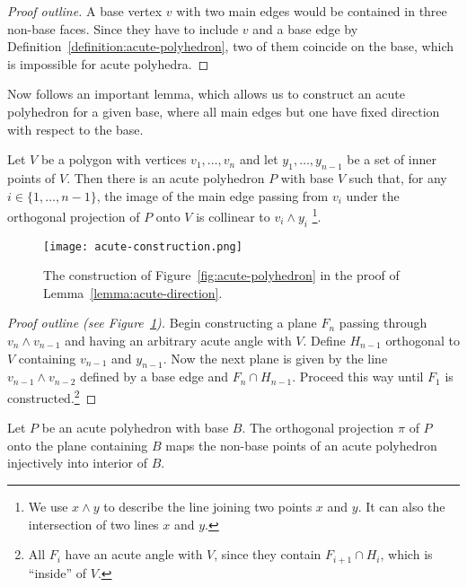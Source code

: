 \begin{proof}[Proof outline]
  A base vertex $v$ with two main edges would be contained in three non-base faces. Since they have to include $v$ and a base edge by Definition~\ref{definition:acute-polyhedron}, two of them coincide on the base, which is impossible for acute polyhedra.
\end{proof}

Now follows an important lemma, which allows us to construct an acute polyhedron for a given base, where all main edges but one have fixed direction with respect to the base.

\begin{lemma}\label{lemma:acute-direction}
  Let $V$ be a polygon with vertices $v_1,\dots,v_n$ and let $y_1,\dots,y_{n-1}$ be a set of inner points of $V$.
  Then there is an acute polyhedron $P$ with base $V$ such that, for any $i \in \{1,\dots,n-1\}$, the image of the main edge passing from $v_i$ under the orthogonal projection of $P$ onto $V$ is collinear to $v_i \wedge y_i$ \footnote{We use $x \wedge y$ to describe the line joining two points $x$ and $y$. It can also the intersection of two lines $x$ and $y$.}.
\end{lemma}

\begin{figure}[ht]
  \centering
  \texttt{[image: acute-construction.png]}
  \caption{The construction of Figure~\ref{fig:acute-polyhedron} in the proof of Lemma~\ref{lemma:acute-direction}.}
  \label{fig:acute-construction}
\end{figure}

\begin{proof}[Proof outline (see Figure~\ref{fig:acute-construction})]
  Begin constructing a plane $F_n$ passing through $v_n \wedge v_{n-1}$ and having an arbitrary acute angle with $V$. Define $H_{n-1}$ orthogonal to $V$ containing $v_{n-1}$ and $y_{n-1}$. Now the next plane is given by the line $v_{n-1} \wedge v_{n-2}$  defined by a base edge and $F_n \cap H_{n-1}$. Proceed this way until $F_1$ is constructed.\footnote{All $F_i$ have an acute angle with $V$, since they contain $F_{i+1} \cap H_i$, which is ``inside'' of $V$.}
\end{proof}

\begin{observation}\label{observation:acute-projection}
  Let $P$ be an acute polyhedron with base $B$.
  The orthogonal projection $\pi$ of $P$ onto the plane containing $B$ maps the non-base points of an acute polyhedron injectively into interior of $B$.
\end{observation}

